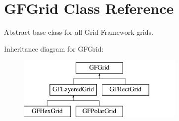 \hypertarget{class_g_f_grid}{\section{G\+F\+Grid Class Reference}
\label{class_g_f_grid}
}


Abstract base class for all Grid Framework grids. 


Inheritance diagram for G\+F\+Grid\+:\begin{figure}[H]
\begin{center}
\leavevmode
\includegraphics[height=3.000000cm]{class_g_f_grid}
\end{center}
\end{figure}

